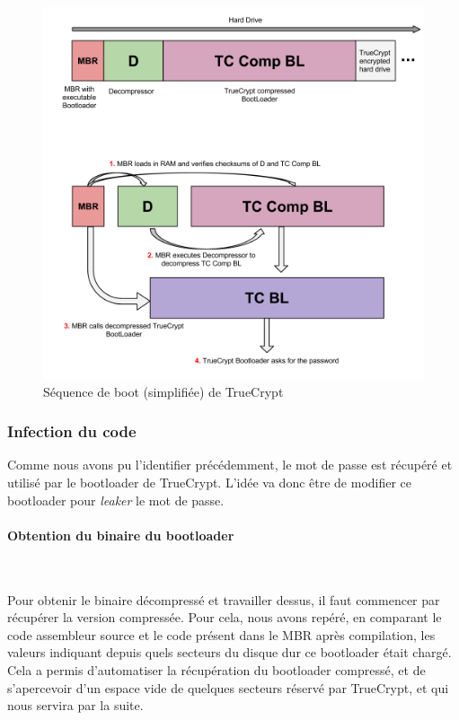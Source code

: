 \documentclass[12pt,a4paper]{article}
\begin{document}
\begin{figure}[H]
    \centering
    \includegraphics[height=0.5\textheight]{img/tc_boot.png}
    \caption{Séquence de boot (simplifiée) de TrueCrypt}
    \label{tc_boot}
\end{figure}

\subsubsection{Infection du code}

Comme nous avons pu l'identifier précédemment, le mot de passe est récupéré et
utilisé par le bootloader de TrueCrypt. L'idée va donc être de modifier ce
bootloader pour \textit{leaker} le mot de passe.

\paragraph{Obtention du binaire du bootloader}~

Pour obtenir le binaire décompressé et travailler dessus, il faut commencer par
récupérer la version compressée. Pour cela, nous avons repéré, en comparant
le code assembleur source et le code présent dans le MBR après compilation,
les valeurs indiquant depuis quels secteurs du disque dur ce bootloader était
chargé. Cela a permis d'automatiser la récupération du bootloader compressé,
et de s'apercevoir d'un espace vide de quelques secteurs réservé par TrueCrypt,
et qui nous servira par la suite.
\end{document}
